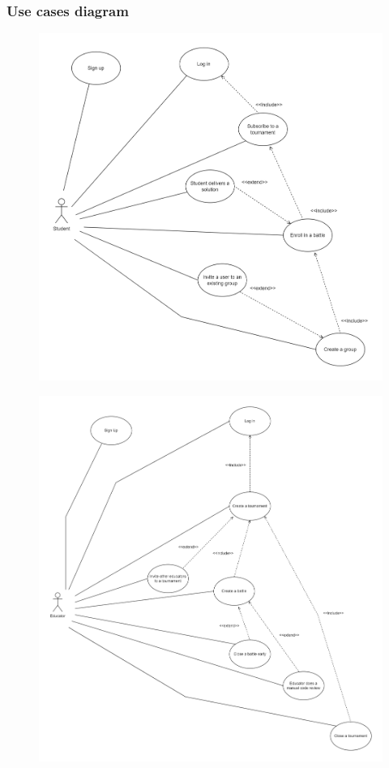 \documentclass[../RASD.tex]{subfiles}
\begin{document}
    \subsubsection*{Use cases diagram}
        \begin{figure}[h!]
            \centering
            \includegraphics[width=1\textwidth]{../assets/section_3/StudentDiagram.png}
        \end{figure}
    \newpage
    \restoregeometry
    \begin{figure}[h!]
        \centering
        \includegraphics[width=1\textwidth]{../assets/section_3/EducatorDiagram.png}
    \end{figure}
    \newpage
\end{document}
